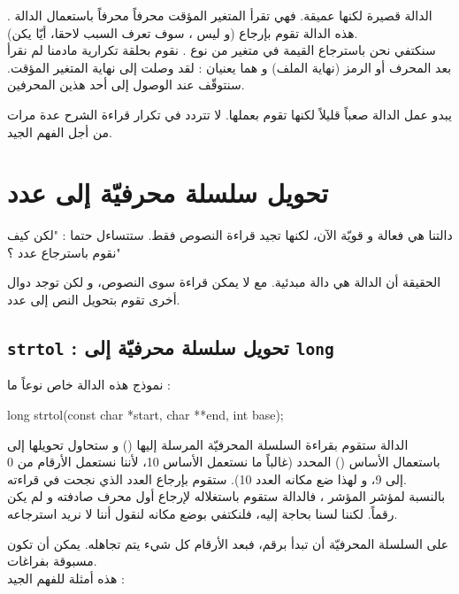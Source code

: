 الدالة
قصيرة لكنها عميقة. فهي تقرأ المتغير المؤقت محرفاً محرفاً باستعمال الدالة
.
هذه الدالة تقوم بإرجاع
(و ليس
،
سوف تعرف السبب لاحقا، أيّا يكن).\\
سنكتفي نحن باسترجاع القيمة في متغير
من نوع
.
نقوم بحلقة تكرارية مادمنا لم نقرأ بعد المحرف
 أو الرمز
(نهاية الملف) و هما يعنيان : لقد وصلت إلى نهاية المتغير المؤقت. سنتوقّف عند الوصول إلى أحد هذين المحرفين.

يبدو عمل الدالة
صعباً قليلاً لكنها تقوم بعملها. لا تتردد في تكرار قراءة الشرح عدة مرات من أجل الفهم الجيد.

\section{تحويل سلسلة محرفيّة إلى عدد}

دالتنا
هي فعالة و قويّة الآن، لكنها تجيد قراءة النصوص فقط. ستتساءل حتما : "لكن كيف نقوم باسترجاع عدد ؟"

الحقيقة أن الدالة
هي دالة مبدئية. مع
لا يمكن قراءة سوى النصوص، و لكن توجد دوال أخرى تقوم بتحويل النص إلى عدد.

\subsection{\texttt{strtol} : تحويل سلسلة محرفيّة إلى \texttt{long}}

نموذج هذه الدالة خاص نوعاً ما :

\begin{Csource}
long strtol(const char *start, char **end, int base);
\end{Csource}

الدالة ستقوم بقراءة السلسلة المحرفيّة المرسلة إليها
()
و ستحاول تحويلها إلى
باستعمال الأساس
()
المحدد (غالباً ما نستعمل الأساس 10، لأننا نستعمل الأرقام من 0 إلى 9، و لهذا ضع مكانه العدد 10). ستقوم بإرجاع العدد الذي نجحت في قراءته.\\
بالنسبة لمؤشر المؤشر
،
فالدالة ستقوم باستغلاله لإرجاع أول محرف صادفته و لم يكن رقماً. لكننا لسنا بحاجة إليه، فلنكتفي بوضع
مكانه لنقول أننا لا نريد استرجاعه.

على السلسلة المحرفيّة أن تبدأ برقم، فبعد الأرقام كل شيء يتم تجاهله. يمكن أن تكون مسبوقة بفراغات.\\
هذه أمثلة للفهم الجيد :

